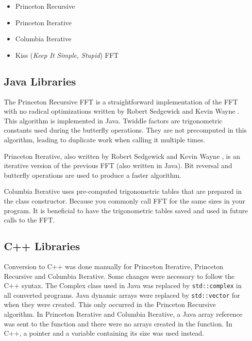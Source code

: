 \begin{itemize}
    \item Princeton Recursive \cite{princeton:recursive}
    \item Princeton Iterative \cite{princeton:iterative}
    \item Columbia Iterative \cite{columbia:iterative}
    \item Kiss (\emph{Keep It Simple, Stupid}) FFT \cite{kiss:fft}
\end{itemize}

\subsection{Java Libraries}

The Princeton Recursive FFT is a straightforward implementation of the FFT with no radical optimizations written by Robert Sedgewick and Kevin Wayne \cite{princeton:recursive}. This algorithm is implemented in Java. Twiddle factors are trigonometric constants used during the butterfly operations. They are not precomputed in this algorithm, leading to duplicate work when calling it multiple times.

Princeton Iterative, also written by Robert Sedgewick and Kevin Wayne \cite{princeton:iterative}, is an iterative version of the previous FFT (also written in Java). Bit reversal and butterfly operations are used to produce a faster algorithm. 

Columbia Iterative \cite{columbia:iterative} uses pre-computed trigonometric tables that are prepared in the class constructor. Because you commonly call FFT for the same sizes in your program. It is beneficial to have the trigonometric tables saved and used in future calls to the FFT.

\subsection{C++ Libraries}
Conversion to C++ was done manually for Princeton Iterative, Princeton Recursive and Columbia Iterative. Some changes were necessary to follow the C++ syntax. The Complex class used in Java was replaced by \texttt{std::complex} in all converted programs. Java dynamic arrays were replaced by \texttt{std::vector} for when they were created. This only occurred in the Princeton Recursive algorithm. In Princeton Iterative and Columbia Iterative, a Java array reference was sent to the function and there were no arrays created in the function. In C++, a pointer and a variable containing its size was used instead. 

